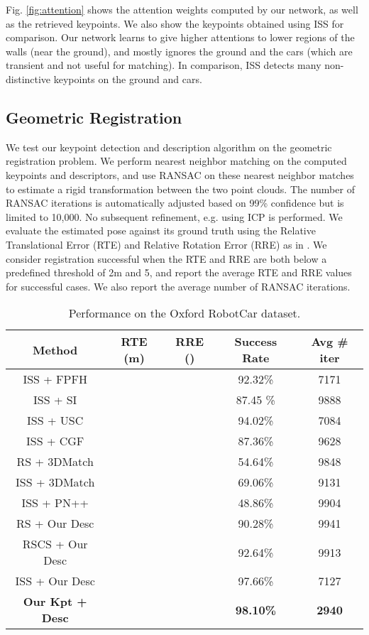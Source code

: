 \documentclass[runningheads]{llncs}
\begin{document}
\medskip
{} \enskip Fig. \ref{fig:attention} shows the attention weights computed by our network, as well as the retrieved keypoints. We also show the keypoints obtained using ISS for comparison. Our network learns to give higher attentions to lower regions of the walls (near the ground), and mostly ignores the ground and the cars (which are transient and not useful for matching). In comparison, ISS detects many non-distinctive keypoints on the ground and cars.

\subsection {Geometric Registration}
We test our keypoint detection and description algorithm on the geometric registration problem. We perform nearest neighbor matching on the computed keypoints and descriptors, and use RANSAC on these nearest neighbor matches to estimate a rigid transformation between the two point clouds. The number of RANSAC iterations is automatically adjusted based on 99\% confidence but is limited to 10,000. No subsequent refinement, e.g. using ICP is performed.
We evaluate the estimated pose against its ground truth using the Relative Translational Error (RTE) and Relative Rotation Error (RRE) as in  \cite{Elbaz2017CVPR,RTERRE}. 
We consider registration successful when the RTE and RRE are both below a predefined threshold of 2m and 5, and report the average RTE and RRE values for successful cases. We also report the average number of RANSAC iterations.

\begin{table}
\centering
\caption{Performance on the Oxford RobotCar dataset.}
\label{table:model-reg}
\begin{tabular*}{\textwidth}{@{\extracolsep{\fill}}c||cccc}
\hline
Method & RTE (m) & RRE () & Success Rate & Avg \# iter\\
\hline
ISS \cite{ISS} + FPFH \cite{FPFH} &  &  & 92.32\% & 7171 \\
ISS \cite{ISS} + SI \cite{SpinImage} &  &  & 87.45 \% & 9888\\
ISS \cite{ISS} + USC \cite{USC} &  &  & 94.02\% & 7084 \\
ISS \cite{ISS} + CGF \cite{CGF}  &  &  & 87.36\% & 9628 \\
RS + 3DMatch \cite{zeng20163dmatch}  &  &  & 54.64\% & 9848 \\
ISS \cite{ISS} + 3DMatch \cite{zeng20163dmatch}  &  &  & 69.06\% & 9131 \\
ISS \cite{ISS} + PN++ \cite{pointnetpp} &  &  & 48.86\% & 9904 \\
\hline
RS + Our Desc &  &  & 90.28\% & 9941 \\
RSCS \cite{Elbaz2017CVPR} + Our Desc &  &  & 92.64\% & 9913\\
ISS \cite{ISS} + Our Desc &  &  & 97.66\% & 7127 \\
\textbf{Our Kpt + Desc} &  &  & \textbf{98.10\%} & \textbf{2940} \\
\hline
\end{tabular*}
\end{table}
\end{document}
